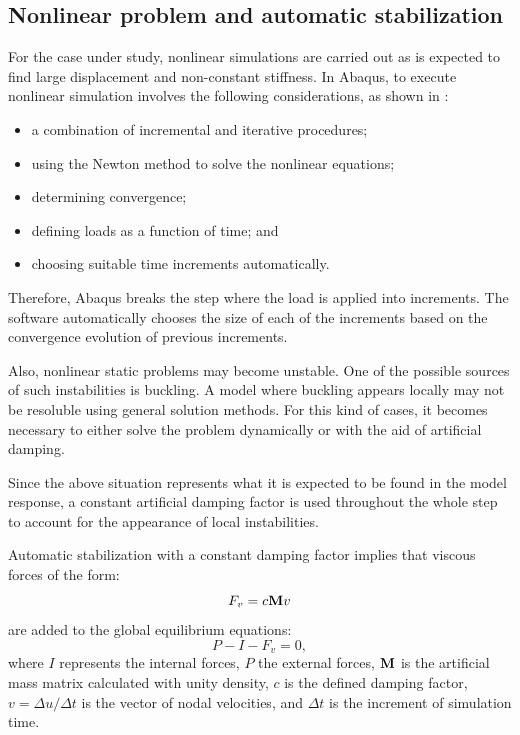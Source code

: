   \clearpage
  \subsection{Nonlinear problem and automatic stabilization} \label{subsec:nonlinear_results_model} %

    For the case under study, nonlinear simulations are carried out as is expected to find large displacement and non-constant stiffness. In Abaqus, to execute nonlinear simulation involves the following considerations, as shown in \cite{Abaqus}:
    \begin{itemize}
      \item a combination of incremental and iterative procedures;
      \item using the Newton method to solve the nonlinear equations;
      \item determining convergence;
      \item defining loads as a function of time; and
      \item choosing suitable time increments automatically.
    \end{itemize}

    Therefore, Abaqus breaks the step where the load is applied into increments. The software automatically chooses the size of each of the increments based on the convergence evolution of previous increments.

    Also, nonlinear static problems may become unstable. One of the possible sources of such instabilities is buckling. A model where buckling appears locally may not be resoluble using general solution methods. For this kind of cases, it becomes necessary to either solve the problem dynamically or with the aid of artificial damping.

    Since the above situation represents what it is expected to be found in the model response, a constant artificial damping factor is used throughout the whole step to account for the appearance of local instabilities.

    \noindent
    Automatic stabilization with a constant damping factor implies that viscous forces of the form:
    \begin{equation}
      F_v = c \mathrm{\textbf{M}} v
    \end{equation}
    are added to the global equilibrium equations:
    \begin{equation}
      P - I - F_v = 0,
    \end{equation}
    where $I$ represents the internal forces, $P$ the external forces, $\mathrm{\textbf{M}}$ is the artificial mass matrix calculated with unity density, $c$ is the defined damping factor, $v = \Delta u / \Delta t$ is the vector of nodal velocities, and $\Delta t$ is the increment of simulation time.

